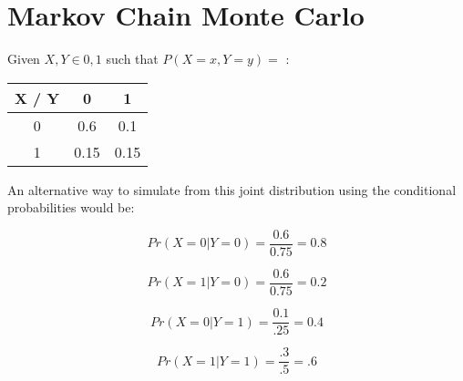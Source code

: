 \documentclass[12pt]{report}
\begin{document}

\maketitle

\vspace*{.1in}



\section{Markov Chain Monte Carlo}

Given $X, Y \in {0,1}$ such that $P(X = x, Y = y) =$ :



\begin{center}
\begin{tabular}{ |c|c|c| } 
 \hline
 X / Y & 0 & 1 \\ 
 \hline
 0 & 0.6 & 0.1 \\ 
 1 & 0.15 & 0.15 \\ 
 \hline
\end{tabular}
\end{center}

An alternative way to simulate from this joint distribution using the conditional probabilities would be:

\begin{equation}
Pr(X = 0| Y = 0) = \frac{0.6}{0.75} = 0.8
\end{equation}

\begin{equation}
Pr(X = 1| Y = 0) = \frac{0.6}{0.75} = 0.2
\end{equation}

\begin{equation}
Pr(X = 0| Y = 1) = \frac{0.1}{.25} = 0.4
\end{equation}

\begin{equation}
Pr(X = 1| Y = 1) = \frac{.3}{.5} = .6
\end{equation}
\end{document}
